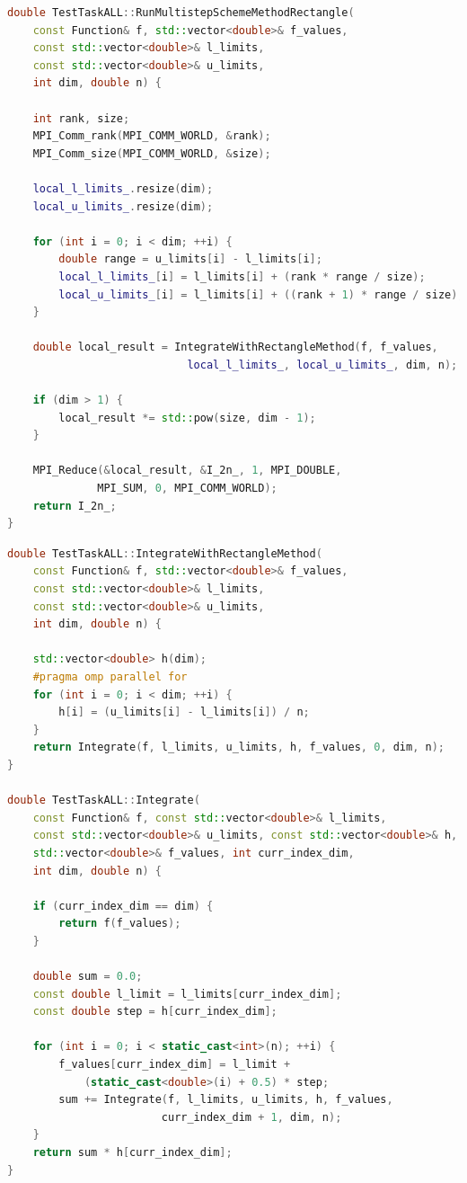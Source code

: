 \documentclass[14pt,a4paper]{article}
\begin{document}
\begin{framed}
\begin{lstlisting}[language=C++]
double TestTaskALL::RunMultistepSchemeMethodRectangle(
    const Function& f, std::vector<double>& f_values,
    const std::vector<double>& l_limits,
    const std::vector<double>& u_limits,
    int dim, double n) {
    
    int rank, size;
    MPI_Comm_rank(MPI_COMM_WORLD, &rank);
    MPI_Comm_size(MPI_COMM_WORLD, &size);

    local_l_limits_.resize(dim);
    local_u_limits_.resize(dim);

    for (int i = 0; i < dim; ++i) {
        double range = u_limits[i] - l_limits[i];
        local_l_limits_[i] = l_limits[i] + (rank * range / size);
        local_u_limits_[i] = l_limits[i] + ((rank + 1) * range / size);
    }

    double local_result = IntegrateWithRectangleMethod(f, f_values, 
                            local_l_limits_, local_u_limits_, dim, n);

    if (dim > 1) {
        local_result *= std::pow(size, dim - 1);
    }

    MPI_Reduce(&local_result, &I_2n_, 1, MPI_DOUBLE, 
              MPI_SUM, 0, MPI_COMM_WORLD);
    return I_2n_;
}
\end{lstlisting}
\end{framed}


\begin{framed}
\begin{lstlisting}[language=C++]
double TestTaskALL::IntegrateWithRectangleMethod(
    const Function& f, std::vector<double>& f_values,
    const std::vector<double>& l_limits,
    const std::vector<double>& u_limits,
    int dim, double n) {
    
    std::vector<double> h(dim);
    #pragma omp parallel for
    for (int i = 0; i < dim; ++i) {
        h[i] = (u_limits[i] - l_limits[i]) / n;
    }
    return Integrate(f, l_limits, u_limits, h, f_values, 0, dim, n);
}

double TestTaskALL::Integrate(
    const Function& f, const std::vector<double>& l_limits,
    const std::vector<double>& u_limits, const std::vector<double>& h,
    std::vector<double>& f_values, int curr_index_dim, 
    int dim, double n) {
    
    if (curr_index_dim == dim) {
        return f(f_values);
    }

    double sum = 0.0;
    const double l_limit = l_limits[curr_index_dim];
    const double step = h[curr_index_dim];

    for (int i = 0; i < static_cast<int>(n); ++i) {
        f_values[curr_index_dim] = l_limit + 
            (static_cast<double>(i) + 0.5) * step;
        sum += Integrate(f, l_limits, u_limits, h, f_values, 
                        curr_index_dim + 1, dim, n);
    }
    return sum * h[curr_index_dim];
}
\end{lstlisting}
\end{framed}
\end{document}
